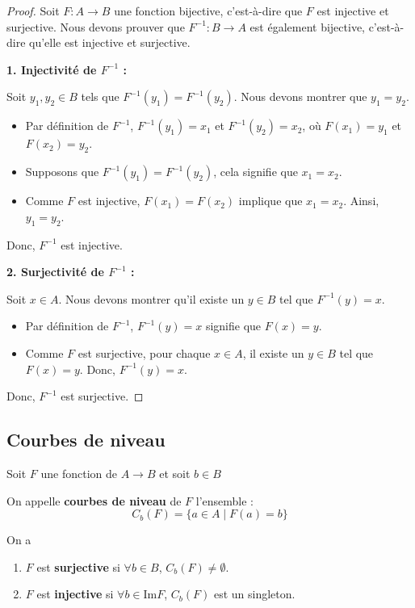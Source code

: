 \begin{proof}
    Soit \( F : A \to B \) une fonction bijective, c'est-à-dire que \( F \) est injective et surjective. Nous devons prouver que \( F^{-1} : B \to A \) est également bijective, c'est-à-dire qu'elle est injective et surjective.

\medskip
\textbf{1. Injectivité de \( F^{-1} \) :}

Soit \( y_1, y_2 \in B \) tels que \( F^{-1}(y_1) = F^{-1}(y_2) \). Nous devons montrer que \( y_1 = y_2 \).

\begin{itemize}
    \item Par définition de \( F^{-1} \), \( F^{-1}(y_1) = x_1 \) et \( F^{-1}(y_2) = x_2 \), où \( F(x_1) = y_1 \) et \( F(x_2) = y_2 \).
    \item Supposons que \( F^{-1}(y_1) = F^{-1}(y_2) \), cela signifie que \( x_1 = x_2 \).
    \item Comme \( F \) est injective, \( F(x_1) = F(x_2) \) implique que \( x_1 = x_2 \). Ainsi, \( y_1 = y_2 \).
\end{itemize}

Donc, \( F^{-1} \) est injective.

\medskip
\textbf{2. Surjectivité de \( F^{-1} \) :}

Soit \( x \in A \). Nous devons montrer qu'il existe un \( y \in B \) tel que \( F^{-1}(y) = x \).

\begin{itemize}
    \item Par définition de \( F^{-1} \), \( F^{-1}(y) = x \) signifie que \( F(x) = y \).
    \item Comme \( F \) est surjective, pour chaque \( x \in A \), il existe un \( y \in B \) tel que \( F(x) = y \). Donc, \( F^{-1}(y) = x \).
\end{itemize}

Donc, \( F^{-1} \) est surjective.
\end{proof}


\subsection{Courbes de niveau}
    

\begin{definition} 
Soit \( F \) une fonction de \( A \to B \) et soit $b\in B$ 

On appelle \textbf{courbes de niveau} de \( F \) l’ensemble :  
  \[
  C_b (F)= \{ a \in A \mid F(a) = b \}
  \]
\end{definition}
\begin{remarque}On a
    
\begin{enumerate}
    \item \( F \) est \textbf{surjective} si \( \forall b \in B \), \( C_b (F) \neq \emptyset \).
    \item \( F \) est \textbf{injective} si \( \forall b \in \text{Im} F \), \( C_b (F) \) est un singleton.
\end{enumerate}
\end{remarque}

